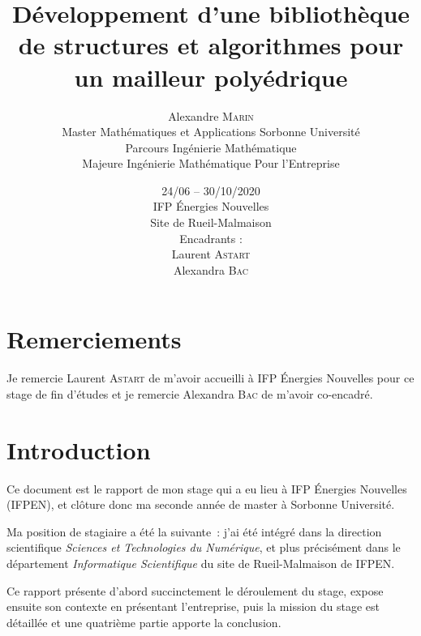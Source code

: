 \documentclass[12pt,a4paper]{report}
\begin{document}
\begin{titlepage}
\author{Alexandre \textsc{Marin}\\ Master Mathématiques et Applications Sorbonne Université\\ Parcours Ingénierie Mathématique\\ Majeure Ingénierie Mathématique Pour l'Entreprise}
\date{24/06 -- 30/10/2020\\ IFP \'Energies Nouvelles\\ Site de Rueil-Malmaison\\[1cm]Encadrants :\\Laurent \textsc{Astart}\\Alexandra \textsc{Bac}}
\title{Développement d’une bibliothèque de structures et algorithmes pour un mailleur polyédrique}
\maketitle
\end{titlepage}


\section*{Remerciements}

Je remercie Laurent \textsc{Astart} de m'avoir accueilli à IFP \'Energies Nouvelles pour ce stage de fin d'études et je remercie Alexandra \textsc{Bac} de m'avoir co-encadré.

\tableofcontents
\newpage


\section{Introduction}
Ce document est le rapport de mon stage qui a eu lieu à IFP \'Energies Nouvelles (IFPEN), et clôture donc ma seconde année de master à Sorbonne Université.

Ma position de stagiaire a été la suivante~: j'ai été intégré dans la direction scientifique \emph{Sciences et Technologies du Numérique}, et plus précisément dans le département \emph{Informatique Scientifique} du site de Rueil-Malmaison de IFPEN.

Ce rapport présente d'abord succinctement le déroulement du stage, expose ensuite son contexte en présentant l'entreprise, puis la mission du stage est détaillée et une quatrième partie apporte la conclusion.
\end{document}
